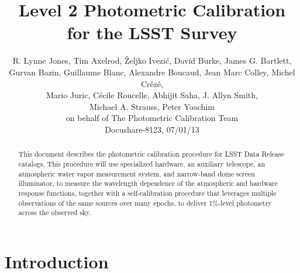 \documentclass[12pt,preprint]{aastex}
\begin{document}
\title{Level 2 Photometric Calibration for the LSST Survey}

\author{
R. Lynne Jones, Tim Axelrod,
{\v Z}eljko Ivezi{\'c},   David Burke,
James G. Bartlett, \\
Gurvan Bazin,
Guillaume Blanc,
Alexandre Boucaud,
Jean Marc Colley,
Michel Cr{\'e}z{\'e}, \\ 
Mario Juric,
C{\'e}cile Roucelle, 
Abhijit Saha, 
J. Allyn Smith, \\
Michael A. Strauss,
Peter Yoachim \\
on behalf of 
The Photometric Calibration Team \\ 
Docushare-8123, 07/01/13 \\
}




\begin{abstract}
This document describes the photometric calibration procedure for LSST
Data Release catalogs. This procedure will use specialized hardware, 
an auxiliary telescope, an atmospheric water vapor measurement system, and narrow-band dome screen illuminator, to
measure the wavelength dependence of the atmospheric and hardware
response functions, together with a self-calibration procedure that
leverages multiple observations of the same sources over many epochs,
to deliver 1\%-level photometry across the observed sky.
\end{abstract}

\tableofcontents

\section{Introduction}
\end{document}

